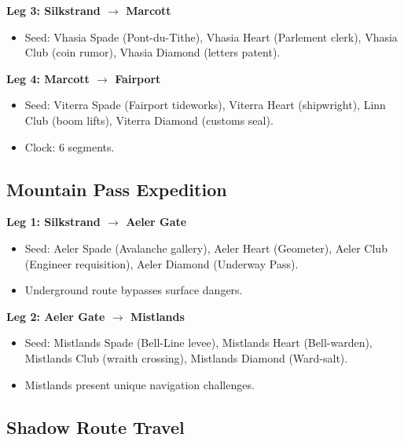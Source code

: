 \textbf{Leg 3: Silkstrand $\rightarrow$ Marcott}
\begin{itemize}
\item Seed: Vhasia Spade (Pont-du-Tithe), Vhasia Heart (Parlement clerk), Vhasia Club (coin rumor), Vhasia Diamond (letters patent).
\end{itemize}

\textbf{Leg 4: Marcott $\rightarrow$ Fairport}
\begin{itemize}
\item Seed: Viterra Spade (Fairport tideworks), Viterra Heart (shipwright), Linn Club (boom lifts), Viterra Diamond (customs seal).
\item Clock: 6 segments.
\end{itemize}

\subsection{Mountain Pass Expedition}
\label{subsec:mountain-pass}

\textbf{Leg 1: Silkstrand $\rightarrow$ Aeler Gate}
\begin{itemize}
\item Seed: Aeler Spade (Avalanche gallery), Aeler Heart (Geometer), Aeler Club (Engineer requisition), Aeler Diamond (Underway Pass).
\item Underground route bypasses surface dangers.
\end{itemize}

\textbf{Leg 2: Aeler Gate $\rightarrow$ Mistlands}
\begin{itemize}
\item Seed: Mistlands Spade (Bell-Line levee), Mistlands Heart (Bell-warden), Mistlands Club (wraith crossing), Mistlands Diamond (Ward-salt).
\item Mistlands present unique navigation challenges.
\end{itemize}

\subsection{Shadow Route Travel}
\label{subsec:shadow-route}

